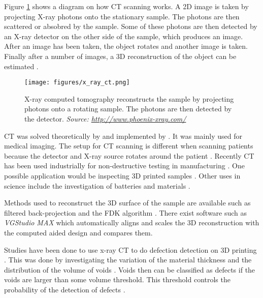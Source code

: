 \documentclass[12pt, a4paper]{memoir}
\begin{document}
Figure \ref{fig:x_ray_ct} shows a diagram on how CT scanning works. A 2D image is taken by projecting X-ray photons onto the stationary sample. The photons are then scattered or absobred by the sample.  Some of these photons are then detected by an X-ray detector on the other side of the sample, which produces an image. After an image has been taken, the object rotates and another image is taken. Finally after a number of images, a 3D reconstruction of the object can be estimated \citep{cantatore2011introduction}.

\begin{figure}
	\centering
	\texttt{[image: figures/x\_ray\_ct.png]}
	\caption{X-ray computed tomography reconstructs the sample by projecting photons onto a rotating sample. The photons are then detected by the detector. \emph{Source: \url{http://www.phoenix-xray.com/}}}
	\label{fig:x_ray_ct}
\end{figure}

CT was solved theoretically by \cite{cormack1973reconstruction} and implemented by \cite{hounsfield1973computerized} \citep{hounsfield1980computed}. It was mainly used for medical imaging. The setup for CT scanning is different when scanning patients because the detector and X-ray source rotates around the patient \citep{cantatore2011introduction}. Recently CT has been used industrially for non-destructive testing in manufacturing \citep{cantatore2011introduction}. One possible application would be inspecting 3D printed samples \citep{villarraga2015assessing}. Other uses in science include the investigation of batteries \citep{o2017investigating} and materials \citep{wang2017x} \citep{zhang2016x}.

Methods used to reconstruct the 3D surface of the sample are available such as filtered back-projection \citep{brooks1976principles} and the FDK algorithm \citep{feldkamp1984practical}. There exist software such as \emph{VGStudio MAX} \citep{reinhart2008industrial} which automatically aligns and scales the 3D reconstruction with the computed aided design and compares them.

Studies have been done to use x-ray CT to do defection detection on 3D printing \citep{kim2016inspection} \citep{villarraga2015assessing}. This was done by investigating the variation of the material thickness and the distribution of the volume of voids \citep{villarraga2015assessing}. Voids then can be classified as defects if the voids are larger than some volume threshold. This threshold controls the probability of the detection of defects \citep{amrhein2014characterization} \citep{gandossi2010probability}.
\end{document}
